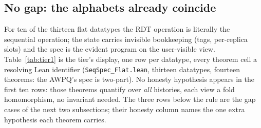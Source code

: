 \documentclass[11pt]{article}
\newcommand{\code}[1]{\texttt{#1}}
\begin{document}
\subsection{No gap: the alphabets already coincide}

For ten of the thirteen flat datatypes the RDT operation is literally
the sequential operation; the state carries invisible bookkeeping
(tags, per-replica slots) and the spec is the evident program on the
user-visible view. Table~\ref{tab:tier1} is the tier's display, one
row per datatype, every theorem cell a resolving Lean identifier
(\code{SeqSpec\_Flat.lean}, thirteen datatypes, fourteen theorems:
the AWPQ's spec is two-part). No honesty hypothesis appears in the
first ten rows: those theorems quantify over \emph{all} histories,
each view a fold homomorphism, no invariant needed. The three rows
below the rule are the gap cases of the next two subsections; their
honesty column names the one extra hypothesis each theorem carries.
\end{document}
